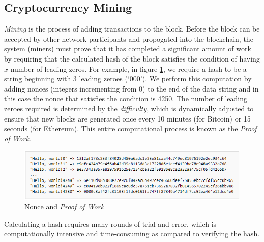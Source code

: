 \documentclass[a4paper,12pt]{article}
\begin{document}
{	\subsection{Cryptocurrency Mining}
	\label{mining}
	\textit{Mining} is the process of adding transactions to the block. Before the block can be accepted by other network participants and propogated into the blockchain, the system (miners) must prove that it has completed a significant amount of work by requiring that the calculated hash of the block satisfies the condition of having $x$ number of leading zeros. For example, in figure \ref{noncepow}, we require a hash to be a string beginning with 3 leading zeroes (`000'). We perform this computation by adding nonces (integers incrementing from 0) to the end of the data string and in this case the nonce that satisfies the condition is 4250. The number of leading zeroes required is determined by the \textit{difficulty}, which is dynamically adjusted to ensure that new blocks are generated once every 10 minutes (for Bitcoin) or 15 seconds (for Ethereum). This entire computational process is known as the \textit{Proof of Work}. 
	\begin{figure}[H]
		\centering
		\includegraphics[width=1\linewidth]{noncepow}
		\caption{Nonce and \textit{Proof of Work}}
		\label{noncepow}
	\end{figure}
	\noindent Calculating a hash requires many rounds of trial and error, which is computationally intensive and time-consuming as compared to verifying the hash.
}
\end{document}
